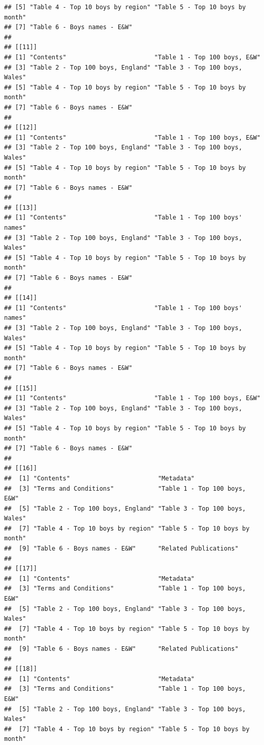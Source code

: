 \documentclass[]{book}
\begin{document}
\begin{verbatim}
## [5] "Table 4 - Top 10 boys by region" "Table 5 - Top 10 boys by month" 
## [7] "Table 6 - Boys names - E&W"     
## 
## [[11]]
## [1] "Contents"                        "Table 1 - Top 100 boys, E&W"    
## [3] "Table 2 - Top 100 boys, England" "Table 3 - Top 100 boys, Wales"  
## [5] "Table 4 - Top 10 boys by region" "Table 5 - Top 10 boys by month" 
## [7] "Table 6 - Boys names - E&W"     
## 
## [[12]]
## [1] "Contents"                        "Table 1 - Top 100 boys, E&W"    
## [3] "Table 2 - Top 100 boys, England" "Table 3 - Top 100 boys, Wales"  
## [5] "Table 4 - Top 10 boys by region" "Table 5 - Top 10 boys by month" 
## [7] "Table 6 - Boys names - E&W"     
## 
## [[13]]
## [1] "Contents"                        "Table 1 - Top 100 boys' names"  
## [3] "Table 2 - Top 100 boys, England" "Table 3 - Top 100 boys, Wales"  
## [5] "Table 4 - Top 10 boys by region" "Table 5 - Top 10 boys by month" 
## [7] "Table 6 - Boys names - E&W"     
## 
## [[14]]
## [1] "Contents"                        "Table 1 - Top 100 boys' names"  
## [3] "Table 2 - Top 100 boys, England" "Table 3 - Top 100 boys, Wales"  
## [5] "Table 4 - Top 10 boys by region" "Table 5 - Top 10 boys by month" 
## [7] "Table 6 - Boys names - E&W"     
## 
## [[15]]
## [1] "Contents"                        "Table 1 - Top 100 boys, E&W"    
## [3] "Table 2 - Top 100 boys, England" "Table 3 - Top 100 boys, Wales"  
## [5] "Table 4 - Top 10 boys by region" "Table 5 - Top 10 boys by month" 
## [7] "Table 6 - Boys names - E&W"     
## 
## [[16]]
##  [1] "Contents"                        "Metadata"                       
##  [3] "Terms and Conditions"            "Table 1 - Top 100 boys, E&W"    
##  [5] "Table 2 - Top 100 boys, England" "Table 3 - Top 100 boys, Wales"  
##  [7] "Table 4 - Top 10 boys by region" "Table 5 - Top 10 boys by month" 
##  [9] "Table 6 - Boys names - E&W"      "Related Publications"           
## 
## [[17]]
##  [1] "Contents"                        "Metadata"                       
##  [3] "Terms and Conditions"            "Table 1 - Top 100 boys, E&W"    
##  [5] "Table 2 - Top 100 boys, England" "Table 3 - Top 100 boys, Wales"  
##  [7] "Table 4 - Top 10 boys by region" "Table 5 - Top 10 boys by month" 
##  [9] "Table 6 - Boys names - E&W"      "Related Publications"           
## 
## [[18]]
##  [1] "Contents"                        "Metadata"                       
##  [3] "Terms and Conditions"            "Table 1 - Top 100 boys, E&W"    
##  [5] "Table 2 - Top 100 boys, England" "Table 3 - Top 100 boys, Wales"  
##  [7] "Table 4 - Top 10 boys by region" "Table 5 - Top 10 boys by month" 

\end{verbatim}
\end{document}
